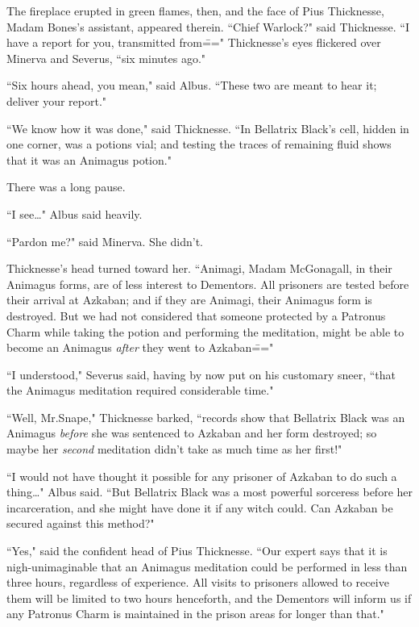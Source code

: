 The fireplace erupted in green flames, then, and the face of Pius Thicknesse, Madam Bones's assistant, appeared therein. ``Chief Warlock?" said Thicknesse. ``I have a report for you, transmitted from\===" Thicknesse's eyes flickered over Minerva and Severus, ``six minutes ago."

``Six hours ahead, you mean," said Albus. ``These two are meant to hear it; deliver your report."

``We know how it was done," said Thicknesse. ``In Bellatrix Black's cell, hidden in one corner, was a potions vial; and testing the traces of remaining fluid shows that it was an Animagus potion."

There was a long pause.

``I see{\ldots}" Albus said heavily.

``Pardon me?" said Minerva. She didn't.

Thicknesse's head turned toward her. ``Animagi, Madam McGonagall, in their Animagus forms, are of less interest to Dementors. All prisoners are tested before their arrival at Azkaban; and if they are Animagi, their Animagus form is destroyed. But we had not considered that someone protected by a Patronus Charm while taking the potion and performing the meditation, might be able to become an Animagus \emph{after} they went to Azkaban\==="

``I understood," Severus said, having by now put on his customary sneer, ``that the Animagus meditation required considerable time."

``Well, Mr.\?Snape," Thicknesse barked, ``records show that Bellatrix Black was an Animagus \emph{before} she was sentenced to Azkaban and her form destroyed; so maybe her \emph{second} meditation didn't take as much time as her first!"

``I would not have thought it possible for any prisoner of Azkaban to do such a thing{\ldots}" Albus said. ``But Bellatrix Black was a most powerful sorceress before her incarceration, and she might have done it if any witch could. Can Azkaban be secured against this method?"

``Yes," said the confident head of Pius Thicknesse. ``Our expert says that it is nigh-unimaginable that an Animagus meditation could be performed in less than three hours, regardless of experience. All visits to prisoners allowed to receive them will be limited to two hours henceforth, and the Dementors will inform us if any Patronus Charm is maintained in the prison areas for longer than that."

